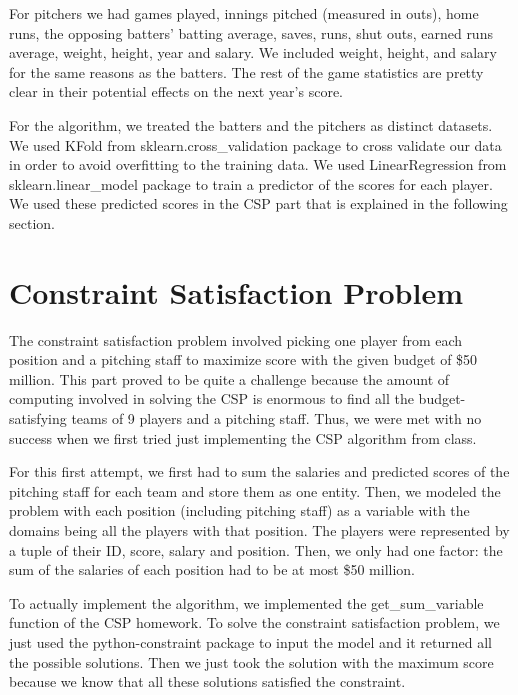 \documentclass[12pt]{amsart}
\begin{document}
For pitchers we had games played, innings pitched (measured in outs), home runs, the opposing batters' batting average, saves, runs, shut outs, earned runs average, weight, height, year and salary. We included weight, height, and salary for the same reasons as the batters. The rest of the game statistics are pretty clear in their potential effects on the next year's score. 
\vspace{.4cm}

For the algorithm, we treated the batters and the pitchers as distinct datasets. We used KFold from sklearn.cross\_validation package to cross validate our data in order to avoid overfitting to the training data. We used LinearRegression from sklearn.linear\_model package to train a predictor of the scores for each player. We used these predicted scores in the CSP part that is explained in the following section.
\section{\large Constraint Satisfaction Problem}
The constraint satisfaction problem involved picking one player from each position and a pitching staff to maximize score with the given budget of \$50 million. This part proved to be quite a challenge because the amount of computing involved in solving the CSP is enormous to find all the budget-satisfying teams of 9 players and a pitching staff. Thus, we were met with no success when we first tried just implementing the CSP algorithm from class.
\vspace{.4cm}

For this first attempt, we first had to sum the salaries and predicted scores of the pitching staff for each team and store them as one entity. Then, we modeled the problem with each position (including pitching staff) as a variable with the domains being all the players with that position. The players were represented by a tuple of their ID, score, salary and position. Then, we only had one factor: the sum of the salaries of each position had to be at most \$50 million.
\vspace{.4cm}

To actually implement the algorithm, we implemented the get\_sum\_variable function of the CSP homework. To solve the constraint satisfaction problem, we just used the python-constraint package to input the model and it returned all the possible solutions. Then we just took the solution with the maximum score because we know that all these solutions satisfied the constraint.
\vspace{.4cm}
\end{document}
